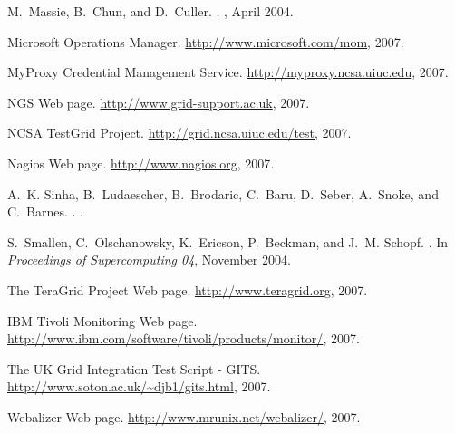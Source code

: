 \documentclass{sig-alternate}
\begin{document}
\begin{thebibliography}{10}
M.~Massie, B.~Chun, and D.~Culler.
.
, April 2004.

{Microsoft Operations Manager}.
\newblock \url{http://www.microsoft.com/mom}, 2007.

{MyProxy Credential Management Service}.
\newblock \url{http://myproxy.ncsa.uiuc.edu}, 2007.

{NGS Web page}.
\newblock \url{http://www.grid-support.ac.uk}, 2007.

{NCSA TestGrid Project}.
\newblock \url{http://grid.ncsa.uiuc.edu/test}, 2007.

{Nagios Web page}.
\newblock \url{http://www.nagios.org}, 2007.

A.~K. Sinha, B.~Ludaescher, B.~Brodaric, C.~Baru, D.~Seber, A.~Snoke, and
  C.~Barnes.
.
.

S.~Smallen, C.~Olschanowsky, K.~Ericson, P.~Beckman, and J.~M. Schopf.
.
\newblock In {\em Proceedings of Supercomputing 04}, November 2004.

{The TeraGrid Project Web page}.
\newblock \url{http://www.teragrid.org}, 2007.

\vfill\eject

{IBM Tivoli Monitoring Web page}.
\newblock \url{http://www.ibm.com/software/tivoli/products/monitor/}, 2007.

{The UK Grid Integration Test Script - GITS}.
\newblock \url{http://www.soton.ac.uk/~djb1/gits.html}, 2007.

{Webalizer Web page}.
\newblock \url{http://www.mrunix.net/webalizer/}, 2007.

\end{thebibliography}
\end{document}
